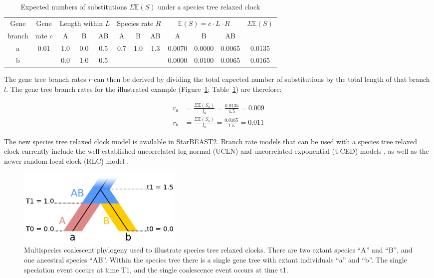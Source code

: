 \documentclass[nogrid]{MBE}%
\begin{document}
\begin{table}[htb!]
\caption{Expected numbers of substitutions $\Sigma \mathbb{E}(S)$ under a species tree relaxed clock}
\label{tab:branchRateModel}
\begin{threeparttable}
\begin{tabular*}{\textwidth}{@{\extracolsep{\fill}}cccccccccccc@{}}
\hline
Gene & Gene & \multicolumn{3}{c}{Length within $L$} & \multicolumn{3}{c}{Species rate $R$} & \multicolumn{3}{c}{$\mathbb{E}(S) = c\cdot L\cdot R$} & \multirow{2}{*}{$\Sigma \mathbb{E}(S)$}\tabularnewline
branch & rate $c$ & A & B & AB & A & B & AB & A & B & AB & \tabularnewline
\hline
a & \multirow{2}{*}{0.01} & 1.0 & 0.0 & 0.5 & \multirow{2}{*}{0.7} & \multirow{2}{*}{1.0} & \multirow{2}{*}{1.3} & 0.0070 & 0.0000 & 0.0065 & 0.0135\tabularnewline
b & & 0.0 & 1.0 & 0.5 & & & & 0.0000 & 0.0100 & 0.0065 & 0.0165\tabularnewline
\hline
\end{tabular*}
\end{threeparttable}
\end{table}

The gene tree branch rates $r$ can then be derived by dividing the total
expected number of substitutions by the total length of that branch $l$. The
gene tree branch rates for the illustrated example
(Figure~\ref{fig:branchRateModel}; Table~\ref{tab:branchRateModel}) are
therefore:

\begin{align}
r_a &= \frac{\Sigma \mathbb{E}(S_a)}{l_a} = \frac{0.0135}{1.5} = 0.009\\
r_b &= \frac{\Sigma \mathbb{E}(S_b)}{l_b} = \frac{0.0165}{1.5} = 0.011
\end{align}

The new species tree relaxed clock model is available in StarBEAST2. Branch rate
models that can be used with a species tree relaxed clock currently include the
well-established uncorrelated log-normal (UCLN) and uncorrelated exponential
(UCED) models \citep{10.1371/journal.pbio.0040088}, as well as the newer random
local clock (RLC) model \citep{Drummond2010}.

\begin{figure}[htb!]
\centering
\includegraphics[width=8cm]{relaxed_clock.pdf}
\caption
{Multispecies coalescent phylogeny used to illustrate species tree relaxed
clocks. There are two extant species ``A'' and ``B'', and one ancestral species ``AB''.
Within the species tree there is a single gene tree with extant individuals ``a''
and ``b''. The single speciation event occurs at time T1, and the single coalescence
event occurs at time t1.}
\label{fig:branchRateModel}
\end{figure}
\end{document}
